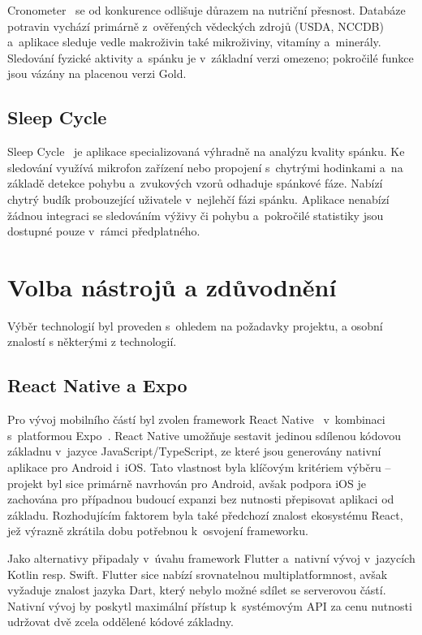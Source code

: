 Cronometer~\cite{cronometer2024} se od konkurence odlišuje důrazem na nutriční
přesnost. Databáze potravin vychází primárně z~ověřených vědeckých zdrojů
(USDA, NCCDB) a~aplikace sleduje vedle makroživin také mikroživiny, vitamíny
a~minerály. Sledování fyzické aktivity a~spánku je v~základní verzi omezeno;
pokročilé funkce jsou vázány na placenou verzi Gold.

\subsection{Sleep Cycle}

Sleep Cycle~\cite{sleepcycle2024} je aplikace specializovaná výhradně na analýzu
kvality spánku. Ke sledování využívá mikrofon zařízení nebo propojení s~chytrými
hodinkami a~na základě detekce pohybu a~zvukových vzorů odhaduje spánkové fáze.
Nabízí chytrý budík probouzející uživatele v~nejlehčí fázi spánku. Aplikace
nenabízí žádnou integraci se sledováním výživy či pohybu a~pokročilé statistiky
jsou dostupné pouze v~rámci předplatného.

\section{Volba nástrojů a zdůvodnění}

Výběr technologií byl proveden s~ohledem na požadavky projektu,
a osobní znalostí s některými z technologií.

\subsection{React Native a Expo}

Pro vývoj mobilního částí byl zvolen framework React Native~\cite{reactnative}
v~kombinaci s~platformou Expo~\cite{expo}. React Native umožňuje sestavit jedinou
sdílenou kódovou základnu v~jazyce JavaScript/TypeScript, ze které jsou generovány nativní
aplikace pro Android i~iOS. Tato vlastnost byla klíčovým kritériem výběru --
projekt byl sice primárně navrhován pro Android, avšak podpora iOS je zachována
pro případnou budoucí expanzi bez nutnosti přepisovat aplikaci od základu.
Rozhodujícím faktorem byla také předchozí znalost ekosystému React, jež výrazně
zkrátila dobu potřebnou k~osvojení frameworku.

Jako alternativy připadaly v~úvahu framework Flutter a~nativní vývoj v~jazycích
Kotlin resp. Swift. Flutter sice nabízí srovnatelnou multiplatformnost, avšak
vyžaduje znalost jazyka Dart, který nebylo možné sdílet se serverovou částí.
Nativní vývoj by poskytl maximální přístup k~systémovým API za cenu nutnosti
udržovat dvě zcela oddělené kódové základny.


